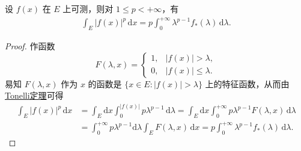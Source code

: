 \documentclass[../../main.tex]{subfiles}%
\begin{document}
\begin{theorem}
设 \( f(x) \) 在 \( E \) 上可测，则对 \( 1 \leqslant  p < +\infty \)，有
\begin{align*}
\int_E |f(x)|^p \, \mathrm{d}x = p \int_0^{+\infty} \lambda^{p - 1} f_*(\lambda) \, \mathrm{d}\lambda. 
\end{align*}
\end{theorem}
\begin{proof}
作函数
\[
F(\lambda, x) = 
\begin{cases} 
1, & |f(x)| > \lambda, \\
0, & |f(x)| \leqslant  \lambda.
\end{cases}
\]
易知 \( F(\lambda, x) \) 作为 \( x \) 的函数是 \( \{ x \in E : |f(x)| > \lambda \} \) 上的特征函数，从而由 \hyperref[theorem:Tonelli定理(非负可测函数的情形)]{Tonelli定理}可得
\begin{align*}
\int_E |f(x)|^p \, \mathrm{d}x &= \int_E \mathrm{d}x \int_0^{|f(x)|} p\lambda^{p - 1} \, \mathrm{d}\lambda = \int_E \mathrm{d}x \int_0^{+\infty} p\lambda^{p - 1} F(\lambda, x) \, \mathrm{d}\lambda \\
&= \int_0^{+\infty} p\lambda^{p - 1} \mathrm{d}\lambda \int_E F(\lambda, x) \, \mathrm{d}x = p \int_0^{+\infty} \lambda^{p - 1} f_*(\lambda) \, \mathrm{d}\lambda.
\end{align*}
\end{proof}
\end{document}
